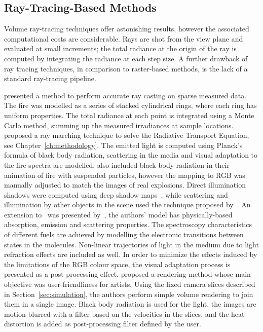 \subsection{Ray-Tracing-Based Methods}
\label{sec:ray_tracing_based}

Volume ray-tracing techniques offer astonishing results, however the associated computational costs are considerable.
Rays are shot from the view plane and evaluated at small increments; the total radiance at the origin of the ray is computed by integrating the radiance at each step size.
A further drawback of ray tracing techniques, in comparison to raster-based methods, is the lack of a standard ray-tracing pipeline.

\cite{Rushmeier:1995} presented a method to perform accurate ray casting on sparse measured data.
The fire was modelled as a series of stacked cylindrical rings, where each ring has uniform properties.
The total radiance at each point is integrated using a Monte Carlo method, summing up the measured irradiances at sample locations. 
\cite{Nguyen:2002} proposed a ray marching technique to solve the Radiative Transport Equation, see Chapter~\ref{ch:methodology}.
The emitted light is computed using Planck's formula of black body radiation, scattering in the media and visual adaptation to the fire spectra are modelled.
\cite{Feldman:2003} also included black body radiation in their animation of fire with suspended particles, however the mapping to RGB was manually adjusted to match the images of real explosions.
Direct illumination shadows were computed using deep shadow maps~\cite{Lokovic:2000}, while scattering and illumination by other objects in the scene used the technique proposed by~\cite{Jensen:2002}.
An extension to~\cite{Nguyen:2002} was presented by~\cite{Pegoraro:2006}, the authors' model has physically-based absorption, emission and scattering properties.
The spectroscopy characteristics of different fuels are achieved by modelling the electronic transitions between states in the molecules.
Non-linear trajectories of light in the medium due to light refraction effects are included as well.
In order to minimize the effects induced by the limitations of the RGB colour space, the visual adaptation process is presented as a post-processing effect.
\cite{Horvath:2009} proposed a rendering method whose main objective was user-friendliness for artists.
Using the fixed camera slices described in Section~\ref{sec:simulation}, the authors perform simple volume rendering to join them in a single image.
Black body radiation is used for the light, the images are motion-blurred with a filter based on the velocities in the slices, and the heat distortion is added as post-processing filter defined by the user. 